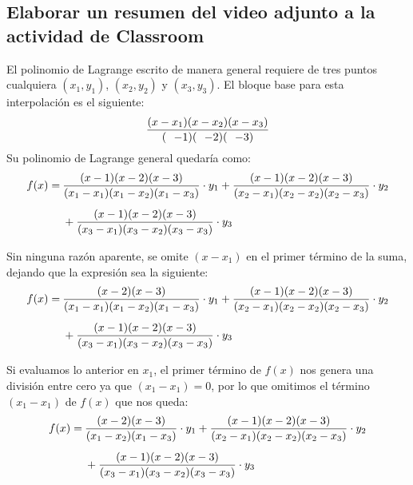 \documentclass[letterpaper, 12pt]{article}
\begin{document}
\thispagestyle{fancy}
\subsection*{Elaborar un resumen del video adjunto a la actividad de Classroom}
\justify
El polinomio de Lagrange escrito de manera general requiere de tres puntos cualquiera \(\left(x_1,y_1\right)\), 
\(\left(x_2,y_2\right)\) y \(\left(x_3,y_3\right)\). El bloque base para esta interpolación es el siguiente:
{\large\[{(x-x_1)(x-x_2)(x-x_3) \over (\:\:\:-1)(\:\:\:-2)(\:\:\:-3)}\]}
Su polinomio de Lagrange general quedaría como:
{\large\begin{equation*}
    \begin{aligned}
        f(x)=\:&{(x-1)(x-2)(x-3)\over(x_1-x_1)(x_1-x_2)(x_1-x_3)}\cdot y_1+
{(x-1)(x-2)(x-3)\over(x_2-x_1)(x_2-x_2)(x_2-x_3)}\cdot y_2\\[5pt]
&+{(x-1)(x-2)(x-3)\over(x_3-x_1)(x_3-x_2)(x_3-x_3)}\cdot y_3\\[5pt]
    \end{aligned}
\end{equation*}}
\justify
Sin ninguna razón aparente, se omite \(\left(x-x_1\right)\) en el primer término de la suma, dejando que la expresión sea la siguiente:
{\large\begin{equation*}
    \begin{aligned}
        f(x)=\:&{(x-2)(x-3)\over(x_1-x_1)(x_1-x_2)(x_1-x_3)}\cdot y_1+
{(x-1)(x-2)(x-3)\over(x_2-x_1)(x_2-x_2)(x_2-x_3)}\cdot y_2\\[5pt]
&+{(x-1)(x-2)(x-3)\over(x_3-x_1)(x_3-x_2)(x_3-x_3)}\cdot y_3\\[5pt]
    \end{aligned}
\end{equation*}}
\justify
Si evaluamos lo anterior en \(x_1\), el primer término de \(f(x)\) nos genera una división entre cero ya que 
\(\left(x_1-x_1\right)=0\), por lo que omitimos el término \(\left(x_1-x_1\right)\) de \(f(x)\) que nos queda:
{\large\begin{equation*}
    \begin{aligned}
        f(x)=\:&{(x-2)(x-3)\over(x_1-x_2)(x_1-x_3)}\cdot y_1+
{(x-1)(x-2)(x-3)\over(x_2-x_1)(x_2-x_2)(x_2-x_3)}\cdot y_2\\[5pt]
&+{(x-1)(x-2)(x-3)\over(x_3-x_1)(x_3-x_2)(x_3-x_3)}\cdot y_3\\[5pt]
    \end{aligned}
\end{equation*}}
\end{document}
